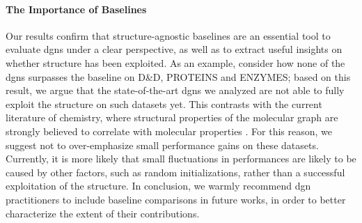

\paragraph{The Importance of Baselines}
Our results confirm that structure-agnostic baselines are an essential tool to evaluate \glspl{dgn} under a clear perspective, as well as to extract useful insights on whether structure has been exploited. As an example, consider how none of the \glspl{dgn} surpasses the baseline on D\&D, PROTEINS and ENZYMES; based on this result, we argue that the state-of-the-art \glspl{dgn} we analyzed are not able to fully exploit the structure on such datasets yet. This contrasts with the current literature of chemistry, where structural properties of the molecular graph are strongly believed to correlate with molecular properties \citep{vanrossum1965chemical}. For this reason, we suggest not to over-emphasize small performance gains on these datasets. Currently, it is more likely that small fluctuations in performances are likely to be caused by other factors, such as random initializations, rather than a successful exploitation of the structure. In conclusion, we warmly recommend \gls{dgn} practitioners to include baseline comparisons in future works, in order to better characterize the extent of their contributions.



